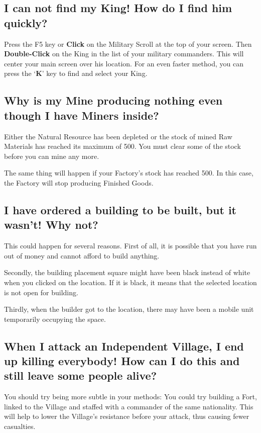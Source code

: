 \subsection{I can not find my King! How do I find him quickly?}


Press the F5 key or \textbf{Click} on the Military Scroll at the top of your screen. Then \textbf{Double-Click} on the King in the list of your military commanders. This will center your main screen over his location. For an even faster method, you can press the ‘\textbf{K}’ key to find and select your King.

\subsection{Why is my Mine producing nothing even though I have Miners inside?}

Either the Natural Resource has been depleted or the stock of mined Raw Materials has reached its maximum of 500. You must clear some of the stock before you can mine any more.

The same thing will happen if your Factory’s stock has reached 500. In this case, the Factory will stop producing Finished Goods.

\subsection{I have ordered a building to be built, but it wasn’t! Why not?}

This could happen for several reasons. First of all, it is possible that you have run out of money and cannot afford to build anything.

Secondly, the building placement square might have been black instead of white when you clicked on the location. If it is black, it means that the selected location is not open for building.


Thirdly, when the builder got to the location, there may have been a mobile unit temporarily occupying the space.

\subsection{When I attack an Independent Village, I end up killing everybody! How can I do this and still leave some people alive?}

You should try being more subtle in your methods: You could try building a Fort, linked to the Village and staffed with a commander of the same nationality. This will help to lower the Village’s resistance before your attack, thus causing fewer casualties.

